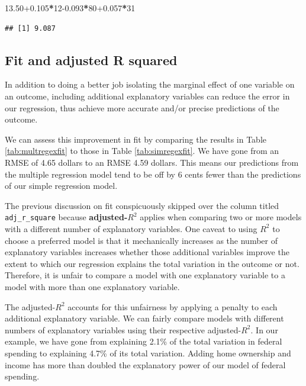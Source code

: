 \documentclass[
]{book}
\newenvironment{Shaded}{\begin{snugshade}}{\end{snugshade}}
\newcommand{\DecValTok}[1]{\textcolor[rgb]{0.00,0.00,0.81}{#1}}
\newcommand{\FloatTok}[1]{\textcolor[rgb]{0.00,0.00,0.81}{#1}}
\newcommand{\OperatorTok}[1]{\textcolor[rgb]{0.81,0.36,0.00}{\textbf{#1}}}
\begin{document}
\begin{Shaded}
\begin{Highlighting}[]
\FloatTok{13.50+0.105}\OperatorTok{*}\DecValTok{12}\FloatTok{-0.093}\OperatorTok{*}\DecValTok{80}\FloatTok{+0.057}\OperatorTok{*}\DecValTok{31}
\end{Highlighting}
\end{Shaded}

\begin{verbatim}
## [1] 9.087
\end{verbatim}

\hypertarget{fit-and-adjusted-r-squared}{%
\subsection{Fit and adjusted R squared}\label{fit-and-adjusted-r-squared}}

In addition to doing a better job isolating the marginal effect of one variable on an outcome, including additional explanatory variables can reduce the error in our regression, thus achieve more accurate and/or precise predictions of the outcome.

We can assess this improvement in fit by comparing the results in Table \ref{tab:multregexfit} to those in Table \ref{tab:simregexfit}. We have gone from an RMSE of 4.65 dollars to an RMSE 4.59 dollars. This means our predictions from the multiple regression model tend to be off by 6 cents fewer than the predictions of our simple regression model.

The previous discussion on fit conspicuously skipped over the column titled \texttt{adj\_r\_square} because \textbf{adjusted-\(R^2\)} applies when comparing two or more models with a different number of explanatory variables. One caveat to using \(R^2\) to choose a preferred model is that it mechanically increases as the number of explanatory variables increases whether those additional variables improve the extent to which our regression explains the total variation in the outcome or not. Therefore, it is unfair to compare a model with one explanatory variable to a model with more than one explanatory variable.

The adjusted-\(R^2\) accounts for this unfairness by applying a penalty to each additional explanatory variable. We can fairly compare models with different numbers of explanatory variables using their respective adjusted-\(R^2\). In our example, we have gone from explaining 2.1\% of the total variation in federal spending to explaining 4.7\% of its total variation. Adding home ownership and income has more than doubled the explanatory power of our model of federal spending.
\end{document}
